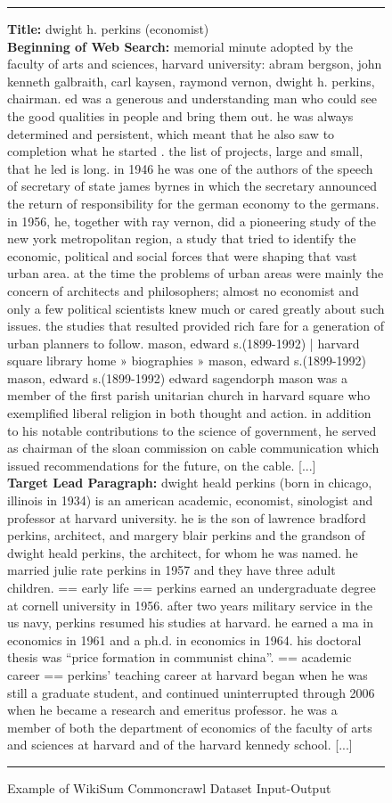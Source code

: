 \documentclass[11pt,a4paper]{article}
\begin{document}
\begin{figure*}[t]
  \small
  \rule{\linewidth}{1pt}
    \noindent \textbf{Title:} dwight h. perkins (economist)\\  

    \noindent \textbf{Beginning of Web Search: } memorial minute adopted by the faculty of arts and sciences, harvard university: abram bergson, john kenneth galbraith, carl kaysen, raymond vernon, dwight h. perkins, chairman. ed was a generous and understanding man who could see the good qualities in people and bring them out. he was always determined and persistent, which meant that he also saw to completion what he started . the list of projects, large and small, that he led is long. in 1946 he was one of the authors of the speech of secretary of state james byrnes in which the secretary announced the return of responsibility for the german economy to the germans. in 1956, he, together with ray vernon, did a pioneering study of the new york metropolitan region, a study that tried to identify the economic, political and social forces that were shaping that vast urban area. at the time the problems of urban areas were mainly the concern of architects and philosophers; almost no economist and only a few political scientists knew much or cared greatly about such issues. the studies that resulted provided rich fare for a generation of urban planners to follow. mason, edward s.(1899-1992) | harvard square library  home » biographies » mason, edward s.(1899-1992) mason, edward s.(1899-1992) edward sagendorph mason was a member of the first parish unitarian church in harvard square who exemplified liberal religion in both thought and action. in addition to his notable contributions to the science of government, he served as chairman of the sloan commission on cable communication which issued recommendations for the future, on the cable.  [...]\\  
    
    \textbf{Target Lead Paragraph:} dwight heald perkins (born in chicago, illinois in 1934) is an american academic, economist, sinologist and professor at harvard university. he is the son of lawrence bradford perkins, architect, and margery blair perkins and the grandson of dwight heald perkins, the architect, for whom he was named. he married julie rate perkins in 1957 and they have three adult children. == early life == perkins earned an undergraduate degree at cornell university in 1956. after two years military service in the us navy, perkins resumed his studies at harvard. he earned a ma in economics in 1961 and a ph.d. in economics in 1964. his doctoral thesis was ``price formation in communist china''. == academic career == perkins' teaching career at harvard began when he was still a graduate student, and continued uninterrupted through 2006 when he became a research and emeritus professor. he was a member of both the department of economics of the faculty of arts and sciences at harvard and of the harvard kennedy school. [...] \\

  \rule{\linewidth}{1pt}
  \caption{Example of WikiSum Commoncrawl Dataset Input-Output}
  \label{fig:example_wikisum}
\end{figure*} 
\end{document}
